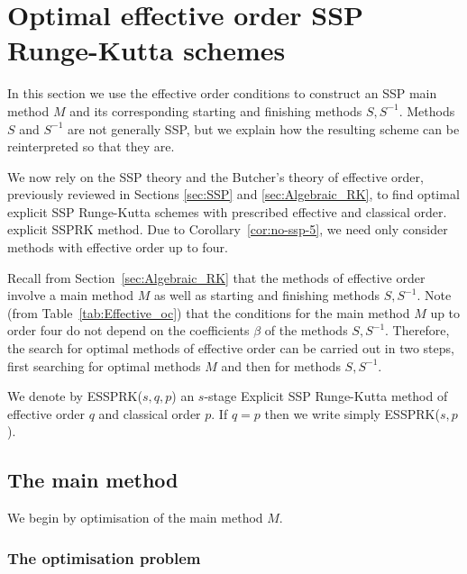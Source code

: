 \section{Optimal effective order SSP Runge-Kutta schemes}\label{sec:Optimal_ESSPRK}
In this section we use the effective order conditions to
construct an SSP main method $M$ and its corresponding starting and finishing
methods $S,S^{-1}$.  Methods $S$ and $S^{-1}$ are not generally SSP, but we
explain how the resulting scheme can be reinterpreted so that they are.

We now rely on the SSP theory and the Butcher's theory of effective order,
previously reviewed in Sections \ref{sec:SSP} and \ref{sec:Algebraic_RK}, to
find optimal explicit SSP Runge-Kutta schemes with prescribed effective and classical order.
explicit SSPRK method.  Due to Corollary~\ref{cor:no-ssp-5}, we need only consider
methods with effective order up to four.

Recall from Section~\ref{sec:Algebraic_RK} that the methods of effective order involve
a main method $M$ as well as starting and finishing methods $S,S^{-1}$.
Note (from Table~\ref{tab:Effective_oc}) that the conditions for the main method $M$
up to order four do not depend on the coefficients $\beta$ of the methods $S,S^{-1}$. 
Therefore, the search for optimal methods of effective order can be carried out in
two steps, first searching for optimal methods $M$ and then for methods $S,S^{-1}$.


We denote by ESSPRK($s,q,p$) an $s$-stage Explicit SSP Runge-Kutta method of
effective order $q$ and classical order $p$. If $q=p$ then we
write simply ESSPRK($s,p$). 

\subsection{The main method}\label{subsection3.1}
We begin by optimisation of the main method $M$.

\subsubsection{The optimisation problem\label{subsection3.1.1}}

